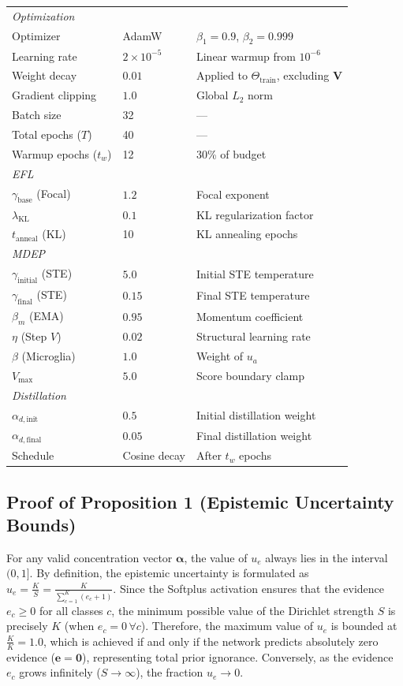 \documentclass[letterpaper]{article} %
\begin{document}
\begin{table}[H]
\begin{tabular}{@{}lll@{}}
\midrule
\multicolumn{3}{l}{\emph{Optimization}} \\
Optimizer & AdamW~\cite{loshchilov2019decoupled, kingma2015adam} & $\beta_1=0.9$, $\beta_2=0.999$ \\
Learning rate & $2 \times 10^{-5}$ & Linear warmup from $10^{-6}$ \\
Weight decay & $0.01$ & Applied to $\Theta_{\text{train}}$, excluding $\bm{V}$ \\
Gradient clipping & $1.0$ & Global $L_2$ norm \\
Batch size & 32 & --- \\
Total epochs ($T$) & 40 & --- \\
Warmup epochs ($t_w$) & 12 & 30\% of budget \\
\midrule
\multicolumn{3}{l}{\emph{EFL}} \\
$\gamma_{\text{base}}$ (Focal) & $1.2$ & Focal exponent \\
$\lambda_{\text{KL}}$ & $0.1$ & KL regularization factor \\
$t_{\text{anneal}}$ (KL) & 10 & KL annealing epochs \\
\midrule
\multicolumn{3}{l}{\emph{MDEP}} \\
$\gamma_{\text{initial}}$ (STE) & $5.0$ & Initial STE temperature \\
$\gamma_{\text{final}}$ (STE) & $0.15$ & Final STE temperature \\
$\beta_m$ (EMA) & $0.95$ & Momentum coefficient \\
$\eta$ (Step $V$) & $0.02$ & Structural learning rate \\
$\beta$ (Microglia) & $1.0$ & Weight of $u_a$ \\
$V_{\max}$ & $5.0$ & Score boundary clamp \\
\midrule
\multicolumn{3}{l}{\emph{Distillation}} \\
$\alpha_{d,\text{init}}$ & $0.5$ & Initial distillation weight \\
$\alpha_{d,\text{final}}$ & $0.05$ & Final distillation weight \\
Schedule & Cosine decay & After $t_w$ epochs \\
\bottomrule
\end{tabular}
\end{table}


\subsection{Proof of Proposition 1 (Epistemic Uncertainty Bounds)}
For any valid concentration vector $\bm{\alpha}$, the value of $u_e$ always lies in the interval $(0, 1]$. By definition, the epistemic uncertainty is formulated as $u_e = \frac{K}{S} = \frac{K}{\sum_{c=1}^K (e_c + 1)}$. Since the Softplus activation ensures that the evidence $e_c \ge 0$ for all classes $c$, the minimum possible value of the Dirichlet strength $S$ is precisely $K$ (when $e_c = 0 \, \forall c$). Therefore, the maximum value of $u_e$ is bounded at $\frac{K}{K} = 1.0$, which is achieved if and only if the network predicts absolutely zero evidence ($\bm{e} = \bm{0}$), representing total prior ignorance. Conversely, as the evidence $e_c$ grows infinitely ($S \to \infty$), the fraction $u_e \to 0$.
\end{document}
